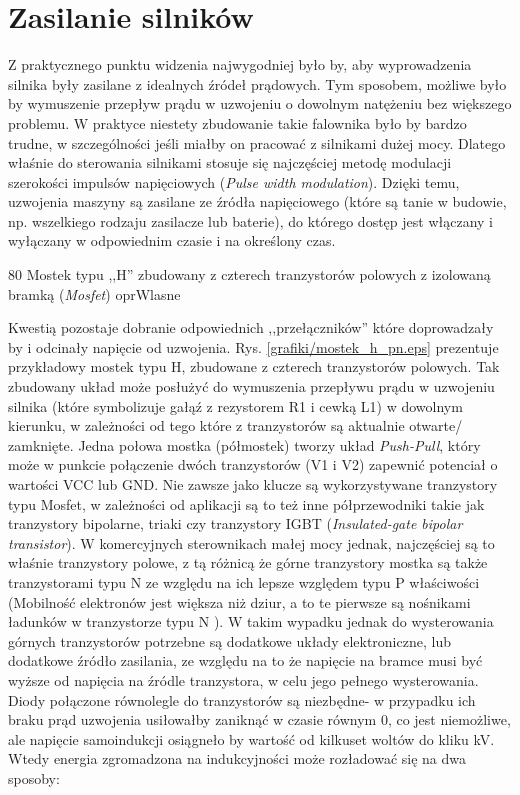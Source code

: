 \section{Zasilanie silników}

Z praktycznego punktu widzenia najwygodniej było by, aby wyprowadzenia silnika były zasilane z idealnych źródeł prądowych. Tym sposobem, możliwe było by wymuszenie przepływ prądu w uzwojeniu o dowolnym natężeniu bez większego problemu. W praktyce niestety zbudowanie takie falownika było by bardzo trudne, w szczególności jeśli miałby on pracować z silnikami dużej mocy. Dlatego właśnie do sterowania silnikami stosuje się najczęściej metodę modulacji szerokości impulsów napięciowych ({\it Pulse width modulation}). Dzięki temu, uzwojenia maszyny są zasilane ze źródła napięciowego (które są tanie w budowie, np. wszelkiego rodzaju zasilacze lub baterie), do którego dostęp jest włączany i wyłączany w odpowiednim czasie i na określony czas.

	{80}
	{Mostek typu ,,H'' zbudowany z czterech tranzystorów polowych z izolowaną bramką ({\it Mosfet})}
	{oprWlasne}

Kwestią pozostaje dobranie odpowiednich ,,przełączników'' które doprowadzały by i odcinały napięcie od uzwojenia. Rys. \ref{grafiki/mostek_h_pn.eps} prezentuje przykładowy mostek typu H, zbudowane z czterech tranzystorów polowych. Tak zbudowany układ może posłużyć do wymuszenia przepływu prądu w uzwojeniu silnika (które symbolizuje gałąź z rezystorem R1 i cewką L1) w dowolnym kierunku, w zależności od tego które z tranzystorów są aktualnie otwarte/ zamknięte. Jedna połowa mostka (półmostek) tworzy układ {\it Push-Pull}, który może w punkcie połączenie dwóch tranzystorów (V1 i V2) zapewnić potenciał o wartości VCC lub GND. Nie zawsze jako klucze są wykorzystywane tranzystory typu Mosfet, w zależności od aplikacji są to też inne półprzewodniki takie jak tranzystory bipolarne, triaki czy tranzystory IGBT ({\it Insulated-gate bipolar transistor}). W komercyjnych sterownikach małej mocy jednak, najczęściej są to właśnie tranzystory polowe, z tą różnicą że górne tranzystory mostka są także tranzystorami typu N ze względu na ich lepsze względem typu P właściwości (Mobilność elektronów jest większa niż dziur, a to te pierwsze są nośnikami ładunków w tranzystorze typu N \cite{tietze}). W takim wypadku jednak do wysterowania górnych tranzystorów potrzebne są dodatkowe układy elektroniczne, lub dodatkowe źródło zasilania, ze względu na to że napięcie na bramce musi być wyższe od napięcia na źródle tranzystora, w celu jego pełnego wysterowania. Diody połączone równolegle do tranzystorów są niezbędne- w przypadku ich braku prąd uzwojenia usiłowałby zaniknąć w czasie równym 0, co jest niemożliwe, ale napięcie samoindukcji osiągneło by wartość od kilkuset woltów do kliku kV. Wtedy energia zgromadzona na indukcyjności może rozładować się na dwa sposoby: 

